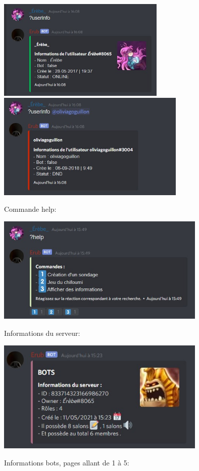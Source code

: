     \includegraphics[width=8cm]{img/userinfo_online.jpg}\includegraphics[width=9cm]{img/userinfo_otheruser.jpg}
    
    Commande help: 
    
    \includegraphics[width=10cm]{img/help.jpg}
    
    Informations du serveur:
    
    \includegraphics[width=10cm]{img/serverinfo.jpg}
    
    Informations bots, pages allant de 1 à 5: 
    
